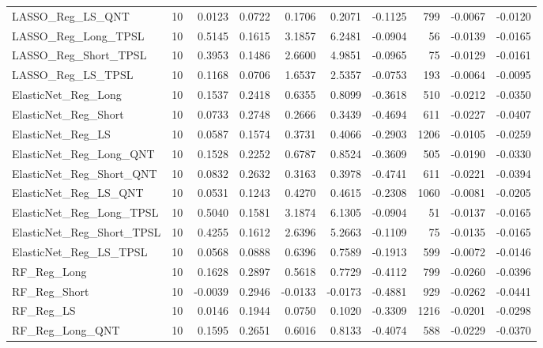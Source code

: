\begin{tabular}{llrrrrrrrr}
\cline{1-10}
LASSO\_Reg\_LS\_QNT & 10 & 0.0123 & 0.0722 & 0.1706 & 0.2071 & -0.1125 & 799 & -0.0067 & -0.0120 \\
\cline{1-10}
LASSO\_Reg\_Long\_TPSL & 10 & 0.5145 & 0.1615 & 3.1857 & 6.2481 & -0.0904 & 56 & -0.0139 & -0.0165 \\
\cline{1-10}
LASSO\_Reg\_Short\_TPSL & 10 & 0.3953 & 0.1486 & 2.6600 & 4.9851 & -0.0965 & 75 & -0.0129 & -0.0161 \\
\cline{1-10}
LASSO\_Reg\_LS\_TPSL & 10 & 0.1168 & 0.0706 & 1.6537 & 2.5357 & -0.0753 & 193 & -0.0064 & -0.0095 \\
\cline{1-10}
ElasticNet\_Reg\_Long & 10 & 0.1537 & 0.2418 & 0.6355 & 0.8099 & -0.3618 & 510 & -0.0212 & -0.0350 \\
\cline{1-10}
ElasticNet\_Reg\_Short & 10 & 0.0733 & 0.2748 & 0.2666 & 0.3439 & -0.4694 & 611 & -0.0227 & -0.0407 \\
\cline{1-10}
ElasticNet\_Reg\_LS & 10 & 0.0587 & 0.1574 & 0.3731 & 0.4066 & -0.2903 & 1206 & -0.0105 & -0.0259 \\
\cline{1-10}
ElasticNet\_Reg\_Long\_QNT & 10 & 0.1528 & 0.2252 & 0.6787 & 0.8524 & -0.3609 & 505 & -0.0190 & -0.0330 \\
\cline{1-10}
ElasticNet\_Reg\_Short\_QNT & 10 & 0.0832 & 0.2632 & 0.3163 & 0.3978 & -0.4741 & 611 & -0.0221 & -0.0394 \\
\cline{1-10}
ElasticNet\_Reg\_LS\_QNT & 10 & 0.0531 & 0.1243 & 0.4270 & 0.4615 & -0.2308 & 1060 & -0.0081 & -0.0205 \\
\cline{1-10}
ElasticNet\_Reg\_Long\_TPSL & 10 & 0.5040 & 0.1581 & 3.1874 & 6.1305 & -0.0904 & 51 & -0.0137 & -0.0165 \\
\cline{1-10}
ElasticNet\_Reg\_Short\_TPSL & 10 & 0.4255 & 0.1612 & 2.6396 & 5.2663 & -0.1109 & 75 & -0.0135 & -0.0165 \\
\cline{1-10}
ElasticNet\_Reg\_LS\_TPSL & 10 & 0.0568 & 0.0888 & 0.6396 & 0.7589 & -0.1913 & 599 & -0.0072 & -0.0146 \\
\cline{1-10}
RF\_Reg\_Long & 10 & 0.1628 & 0.2897 & 0.5618 & 0.7729 & -0.4112 & 799 & -0.0260 & -0.0396 \\
\cline{1-10}
RF\_Reg\_Short & 10 & -0.0039 & 0.2946 & -0.0133 & -0.0173 & -0.4881 & 929 & -0.0262 & -0.0441 \\
\cline{1-10}
RF\_Reg\_LS & 10 & 0.0146 & 0.1944 & 0.0750 & 0.1020 & -0.3309 & 1216 & -0.0201 & -0.0298 \\
\cline{1-10}
RF\_Reg\_Long\_QNT & 10 & 0.1595 & 0.2651 & 0.6016 & 0.8133 & -0.4074 & 588 & -0.0229 & -0.0370 \\

\end{tabular}
